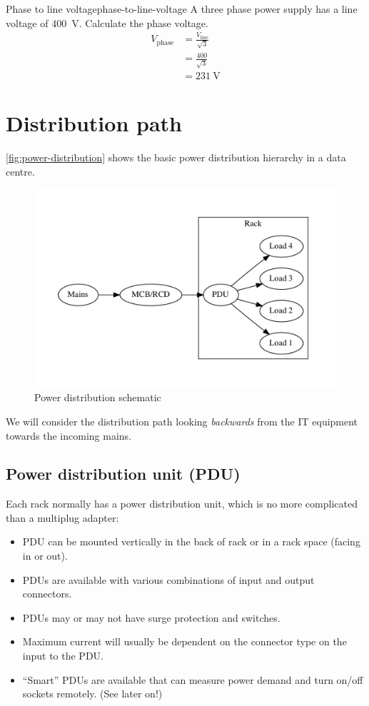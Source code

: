 \documentclass{pgnotes}
\begin{document}
\begin{example}{Phase to line voltage}{phase-to-line-voltage}
  A three phase power supply has a line voltage of \SI{400}{\volt}.
  Calculate the phase voltage.
  \tcblower
  \begin{align}
    V_{\mbox{phase}} & = \frac{V_{\mbox{line}}}{\sqrt{3}} \\
                     & = \frac{400}{\sqrt{3}} \\
                     & = \SI{231}{\volt}
  \end{align}
\end{example}

\newpage
\section{Distribution path}

\autoref{fig:power-distribution} shows the basic power distribution hierarchy in a data centre.

\begin{figure}[htbp]
  \centering
  \includegraphics[width=0.5\linewidth]{power_distribution_diagram}
  \caption{Power distribution schematic}
  \label{fig:power-distribution}
\end{figure}

We will consider the distribution path looking \textit{backwards} from the IT equipment towards the incoming mains.


\subsection{Power distribution unit (PDU)}

Each rack normally has a power distribution unit, which is no more complicated than a multiplug adapter:
\begin{itemize}
\item PDU can be mounted vertically in the back of rack or in a rack space (facing in or out).
\item PDUs are available with various combinations of input and output connectors.
\item PDUs may or may not have surge protection and switches.
\item Maximum current will usually be dependent on the connector type on the input to the PDU.
\item ``Smart'' PDUs are available that can measure power demand and turn on/off sockets remotely. (See later on!)
\end{itemize}
\end{document}
